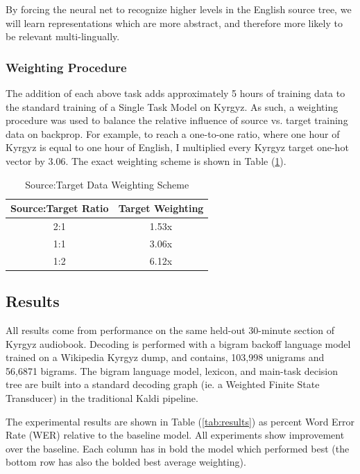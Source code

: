 \documentclass[a4paper]{article}
\begin{document}
By forcing the neural net to recognize higher levels in the English source tree, we will learn representations which are more abstract, and therefore more likely to be relevant multi-lingually. 


\subsubsection{Weighting Procedure}

The addition of each above task adds approximately 5 hours of training data to the standard training of a Single Task Model on Kyrgyz. As such, a weighting procedure was used to balance the relative influence of source vs. target training data on backprop. For example, to reach a one-to-one ratio, where one hour of Kyrgyz is equal to one hour of English, I multiplied every Kyrgyz target one-hot vector by $3.06$. The exact weighting scheme is shown in Table (\ref{tab:weights}).

\begin{table}[!htbp]
  \centering
  \caption{Source:Target Data Weighting Scheme}
  \label{tab:weights}
  \begin{adjustbox}{width=.33\textwidth}
    \begin{tabular}{cc}
      \toprule
      \textbf{Source:Target Ratio} & \textbf{Target Weighting}\\
      \midrule
      2:1 & 1.53x  \\
      1:1 & 3.06x  \\
      1:2 & 6.12x  \\
      \bottomrule
    \end{tabular}
  \end{adjustbox}
\end{table}




\subsection{Results}


All results come from performance on the same held-out 30-minute section of Kyrgyz audiobook. Decoding is performed with a bigram backoff language model trained on a Wikipedia Kyrgyz dump, and contains, 103,998 unigrams and 56,6871 bigrams. The bigram language model, lexicon, and main-task decision tree are built into a standard decoding graph (ie. a Weighted Finite State Transducer) in the traditional Kaldi pipeline. 

The experimental results are shown in Table (\ref{tab:results}) as percent Word Error Rate (WER) relative to the baseline model. All experiments show improvement over the baseline. Each column has in bold the model which performed best (the bottom row has also the bolded best average weighting).
\end{document}
